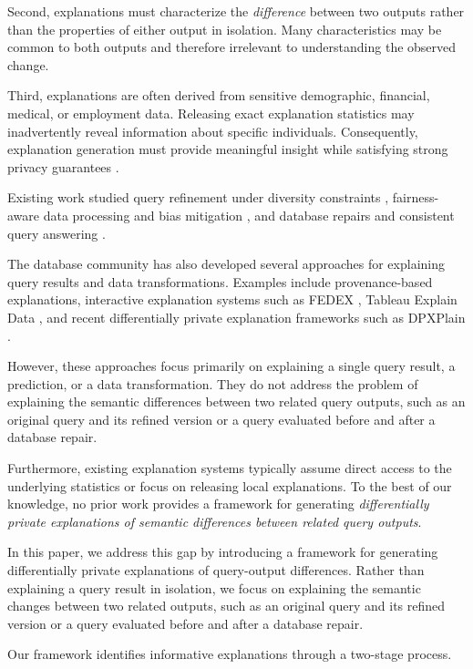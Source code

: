 Second, explanations must characterize the \emph{difference}
between two outputs rather than the properties of either output
in isolation.
Many characteristics may be common to both outputs and therefore
irrelevant to understanding the observed change.

Third, explanations are often derived from sensitive demographic,
financial, medical, or employment data.
Releasing exact explanation statistics may inadvertently reveal
information about specific individuals.
Consequently, explanation generation must provide meaningful
insight while satisfying strong privacy guarantees
\cite{TheAlgFoundDP2014}.

Existing work studied query refinement under diversity constraints
\cite{ERICA,MK09},
fairness-aware data processing and bias mitigation
\cite{MLJ22,LMSJ23,barocas-hardt-narayanan},
and database repairs and consistent query answering
\cite{arenas1999,bertossi2006,bertossi2011}.

The database community has also developed several approaches for
explaining query results and data transformations.
Examples include provenance-based explanations,
interactive explanation systems such as FEDEX \cite{FEDEX},
Tableau Explain Data \cite{TabEE},
and recent differentially private explanation frameworks such as
DPXPlain \cite{TaoGMR22}.

However, these approaches focus primarily on explaining a single
query result, a prediction, or a data transformation.
They do not address the problem of explaining the semantic
differences between two related query outputs, such as an original
query and its refined version or a query evaluated before and after
a database repair.

Furthermore, existing explanation systems typically assume direct
access to the underlying statistics or focus on releasing local
explanations.
To the best of our knowledge, no prior work provides a framework
for generating \emph{differentially private explanations of semantic
differences between related query outputs}.

In this paper, we address this gap by introducing a framework for
generating differentially private explanations of query-output
differences.
Rather than explaining a query result in isolation, we focus on
explaining the semantic changes between two related outputs,
such as an original query and its refined version or a query
evaluated before and after a database repair.

Our framework identifies informative explanations through a
two-stage process.

